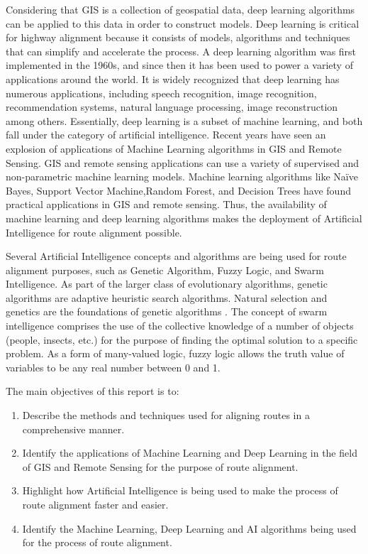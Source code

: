 Considering that GIS is a collection of geospatial data, deep learning algorithms can be applied to this data in order to construct models. Deep learning is critical for highway alignment because it consists of models, algorithms and techniques that can simplify and accelerate the process. A deep learning algorithm was first implemented in the 1960s, and since then it has been used to power a variety of applications around the world. It is widely recognized that deep learning has numerous applications, including speech recognition, image recognition, recommendation systems, natural language processing, image reconstruction among others. Essentially, deep learning is a subset of machine learning, and both fall under the category of artificial intelligence. Recent years have seen an explosion of applications of Machine Learning algorithms in GIS and Remote Sensing. GIS and remote sensing applications can use a variety of supervised and non-parametric machine learning models. Machine learning algorithms like Naïve Bayes, Support Vector Machine,Random Forest, and Decision Trees have found practical applications in GIS and remote sensing. Thus, the availability of machine learning and deep learning algorithms makes the deployment of Artificial Intelligence for route alignment possible. 


Several Artificial Intelligence concepts and algorithms are being used for route alignment purposes, such as Genetic Algorithm, Fuzzy Logic, and Swarm Intelligence. As part of the larger class of evolutionary algorithms, genetic algorithms are adaptive heuristic search algorithms. Natural selection and genetics are the foundations of genetic algorithms . The concept of swarm intelligence comprises the use of the collective knowledge of a number of objects (people, insects, etc.) for the purpose of finding the optimal solution to a specific problem.
As a form of many-valued logic, fuzzy logic allows the truth value of variables to be any real number between 0 and 1.

The main objectives of this report is to:
\begin{enumerate}
    \item Describe the methods and techniques used for aligning routes in a comprehensive manner. 
    \item Identify the applications of Machine Learning and Deep Learning in the field of GIS and Remote Sensing for the purpose of route alignment.
    \item Highlight how Artificial Intelligence is being used to make the process of route alignment faster and easier.
    \item Identify the Machine Learning, Deep Learning and AI algorithms being used for the process of route alignment.  
\end{enumerate}
